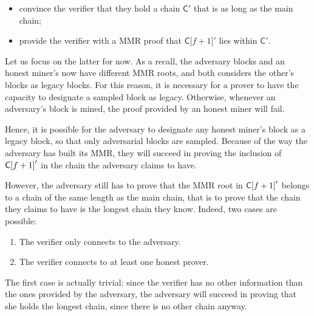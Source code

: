       \begin{itemize}
        \item convince the verifier that they hold a chain \(\mathsf{C}'\) that is as long as the main chain;
        \item provide the verifier with a MMR proof that \(\mathsf{C[}f+1\mathsf{]}'\) lies within \(\mathsf{C}'\).
      \end{itemize}
      
      Let us focus on the latter for now. As a recall, the adversary blocks and an honest miner's now have different MMR roots, and both considers the other's blocks as legacy blocks. For this reason, it is necessary for a prover to have the capacity to designate a sampled block as legacy. Otherwise, whenever an adversary's block is mined, the proof provided by an honest miner will fail.
      
      Hence, it is possible for the adversary to designate any honest miner's block as a legacy block, so that only adversarial blocks are sampled. Because of the way the adversary has built its MMR, they will succeed in proving the inclusion of \(\mathsf{C[}f+1\mathsf{]}'\) in the chain the adversary claims to have.
      
      However, the adversary still has to prove that the MMR root in \(\mathsf{C[}f+1\mathsf{]}'\) belongs to a chain of the same length as the main chain, that is to prove that the chain they claims to have is the longest chain they know. Indeed, two cases are possible:
      
      \begin{enumerate}
      \item The verifier only connects to the adversary.
      \item The verifier connects to at least one honest prover.
      \end{enumerate}
      
      The first case is actually trivial: since the verifier has no other information than the ones provided by the adversary, the adversary will succeed in proving that she holds the longest chain, since there is no other chain anyway.
      

